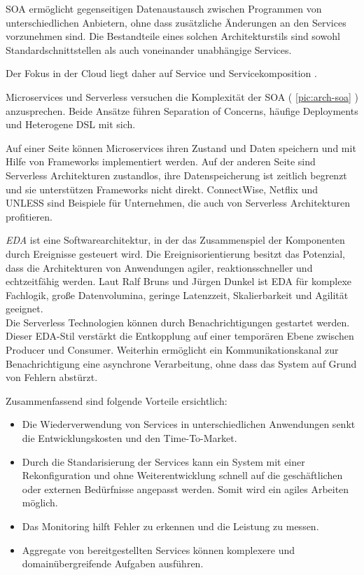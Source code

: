 \documentclass[
12pt,
english,
ngerman,
headsepline,
twoside,
openright,
numbers=noenddot,version=first
]{scrreprt}
\begin{document}
SOA ermöglicht gegenseitigen Datenaustausch zwischen Programmen von unterschiedlichen Anbietern, ohne dass zusätzliche Änderungen an den Services vorzunehmen sind. Die Bestandteile eines solchen Architekturstils sind sowohl Standardschnittstellen als auch voneinander unabhängige Services\cite{archSoa}. 

Der Fokus in der Cloud liegt daher auf Service und Servicekomposition \cite{cloudEssentials}.

Microservices und Serverless versuchen die Komplexität der SOA ( \autoref{pic:arch-soa} ) anzusprechen. Beide Ansätze führen  Separation of Concerns, häufige Deployments und Heterogene \acrfull{DSL} mit sich.\cite{microAdv}

Auf einer Seite können Microservices ihren Zustand und Daten speichern und mit Hilfe von Frameworks implementiert werden. Auf der anderen Seite sind Serverless Architekturen zustandlos, ihre Datenspeicherung ist zeitlich begrenzt und sie unterstützen Frameworks nicht direkt. ConnectWise\cite{ConnectWise}, Netflix\cite{Netflix} und UNLESS\cite{UNLESS} sind Beispiele für Unternehmen, die auch von Serverless Architekturen profitieren.


\textit{\acrfull{EDA}}\label{sec:eda} ist eine Softwarearchitektur, in der das Zusammenspiel der Komponenten durch Ereignisse gesteuert wird. Die Ereignisorientierung besitzt das Potenzial, dass die Architekturen von Anwendungen agiler, reaktionsschneller und
echtzeitfähig werden. Laut Ralf Bruns und Jürgen Dunkel ist \acrshort{EDA} für komplexe Fachlogik, große Datenvolumina, geringe Latenzzeit, Skalierbarkeit und Agilität geeignet.\cite{archEDA}\\
Die Serverless Technologien können durch Benachrichtigungen gestartet werden. Dieser \acrshort{EDA}-Stil verstärkt die Entkopplung auf einer temporären Ebene zwischen Producer und Consumer. Weiterhin ermöglicht ein Kommunikationskanal zur Benachrichtigung eine asynchrone Verarbeitung, ohne dass das System auf Grund von Fehlern abstürzt. \cite{patternIntegrationEnterprise}

Zusammenfassend sind folgende Vorteile ersichtlich:
\begin{itemize}
	\item Die Wiederverwendung von Services in unterschiedlichen Anwendungen senkt die Entwicklungskosten und den Time-To-Market.
	\item Durch die Standarisierung der Services kann ein System mit einer Rekonfiguration und ohne Weiterentwicklung schnell auf die geschäftlichen oder externen Bedürfnisse angepasst werden. Somit wird ein agiles Arbeiten möglich.
	\item Das Monitoring hilft Fehler zu erkennen und die Leistung zu messen.
	\item Aggregate von bereitgestellten Services können komplexere und domainübergreifende Aufgaben ausführen.
\end{itemize}\cite{cloudEssentials}
\end{document}
